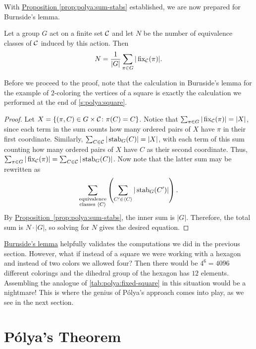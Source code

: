 With \hyperref[prop:polya:sum-stabs]{Proposition
  \ref*{prop:polya:sum-stabs}} established, we are now prepared for
Burnside's lemma.

\begin{lemma}\label{lem:polya:burnside}
  Let a group $G$ act on a finite set $\mathcal{C}$ and let $N$ be the
  number of equivalence classes of $\mathcal{C}$ induced by this
  action. Then
  \[N = \frac{1}{|G|} \sum_{\pi\in G} |\operatorname{fix}_{\mathcal{C}}(\pi)|.\]
\end{lemma}

Before we proceed to the proof, note that the calculation in
Burnside's lemma for the example of $2$-coloring the vertices of a
square is exactly the calculation we performed at the end of \autoref{s:polya:square}.

\begin{proof}
  Let $X=\{(\pi,C)\in G\times \mathcal{C}\colon \pi(C) = C\}$. Notice that
  $\sum_{\pi \in G} |\operatorname{fix}_{\mathcal{C}}(\pi)| = |X|$, since each term in the
  sum counts how many ordered pairs of $X$ have $\pi$ in their first
  coordinate. Similarly, $\sum_{C\in \mathcal{C}} |\operatorname{stab}_G(C)| = |X|$, with
  each term of this sum counting how many ordered pairs of $X$ have
  $C$ as their second coordinate. Thus, $\sum_{\pi \in G}
  |\operatorname{fix}_{\mathcal{C}}(\pi)|=\sum_{C\in \mathcal{C}} |\operatorname{stab}_G(C)|$. Now note that the
  latter sum may be rewritten
  as \[\sum_{\substack{\text{equivalence}\\\text{classes } \langle
      C\rangle}}\left( \sum_{C'\in\langle C\rangle}
    |\operatorname{stab}_G(C')|\right).\] By
  \hyperref[prop:polya:sum-stabs]{Proposition~\ref*{prop:polya:sum-stabs}},
  the inner sum is $|G|$. Therefore, the total sum is $N\cdot |G|$, so
  solving for $N$ gives the desired equation.
\end{proof}

\hyperref[lem:polya:burnside]{Burnside's lemma} helpfully validates
the computations we did in the previous section. However, what if
instead of a square we were working with a hexagon and instead of two
colors we allowed four? Then there would be $4^6=4096$ different
colorings and the dihedral group of the hexagon has $12$
elements. Assembling the analogue of \autoref{tab:polya:fixed-square}
in this situation would be a nightmare! This is where the genius of
P\'olya's approach comes into play, as we see in the next section.

\section{P\'olya's Theorem}\label{s:polya:polya}

